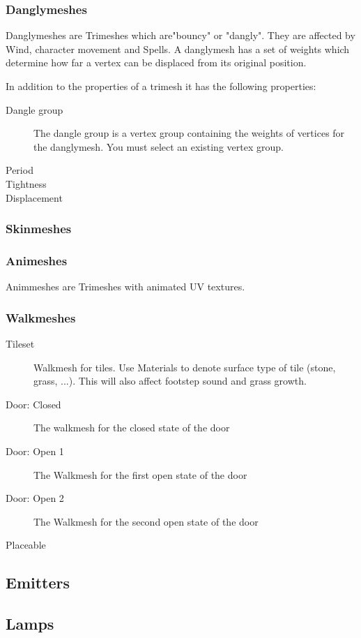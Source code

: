 \subsubsection{Danglymeshes}
Danglymeshes are Trimeshes which are"bouncy" or "dangly". They are affected by
Wind, character movement and Spells. A danglymesh has a set of weights which
determine how far a vertex can be displaced from its original position.

In addition to the properties of a trimesh it has the following properties:
\begin{description}
    \item[Dangle group] The dangle group is a vertex group containing the weights of vertices for the danglymesh. You must select an existing vertex group.
    \item[Period]
    \item[Tightness]
    \item[Displacement]
\end{description}

\subsubsection{Skinmeshes}

\subsubsection{Animeshes}
Animmeshes are Trimeshes with animated UV textures.

\subsubsection{Walkmeshes}
\begin{description}
    \item[Tileset] Walkmesh for tiles. Use Materials to denote surface type of
                   tile (stone, grass, ...). This will also affect footstep
                   sound and grass growth.
    \item[Door: Closed] The walkmesh for the closed state of the door
    \item[Door: Open 1] The Walkmesh for the first open state of the door
    \item[Door: Open 2] The Walkmesh for the second open state of the door
    \item[Placeable]
\end{description}

\subsection{Emitters}

\subsection{Lamps}
